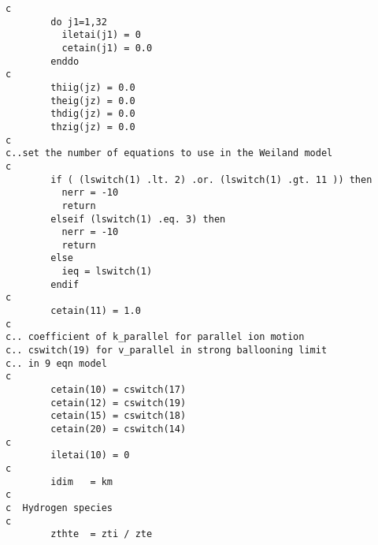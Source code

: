 \begin{verbatim}
c
        do j1=1,32
          iletai(j1) = 0
          cetain(j1) = 0.0
        enddo
c
        thiig(jz) = 0.0
        theig(jz) = 0.0
        thdig(jz) = 0.0
        thzig(jz) = 0.0
c
c..set the number of equations to use in the Weiland model
c
        if ( (lswitch(1) .lt. 2) .or. (lswitch(1) .gt. 11 )) then
          nerr = -10
          return
        elseif (lswitch(1) .eq. 3) then
          nerr = -10
          return
        else
          ieq = lswitch(1)
        endif
c
        cetain(11) = 1.0
c
c.. coefficient of k_parallel for parallel ion motion
c.. cswitch(19) for v_parallel in strong ballooning limit
c.. in 9 eqn model
c
        cetain(10) = cswitch(17)
        cetain(12) = cswitch(19)
        cetain(15) = cswitch(18)
        cetain(20) = cswitch(14)
c
        iletai(10) = 0
c
        idim   = km
c
c  Hydrogen species
c
        zthte  = zti / zte


\end{verbatim}
